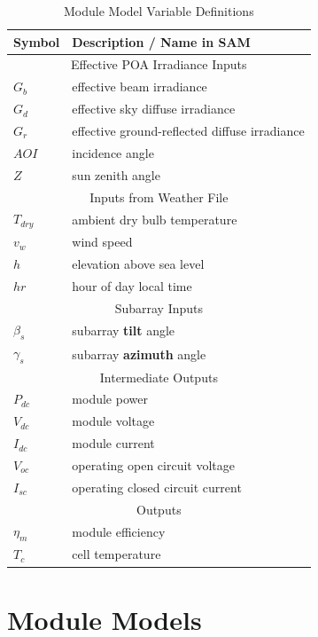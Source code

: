\documentclass[12pt,letterpaper]{article}
\newcommand\AOI{\ensuremath{\mathit{AOI}}}
\begin{document}
\begin{table}
\begin{center}
\caption{Module Model Variable Definitions}
\begin{tabular}{ll}
\midrule
Symbol & Description / \textbf{Name in SAM}\\
\midrule
\multicolumn{2}{c}{Effective POA Irradiance Inputs}\\
$G_b$ & effective beam irradiance \\
$G_d$ & effective sky diffuse irradiance \\
$G_r$ & effective ground-reflected diffuse irradiance  \\
$\AOI$ & incidence angle \\
$Z$ & sun zenith angle \\
\midrule
\multicolumn{2}{c}{Inputs from Weather File}\\
$T_{dry}$ & ambient dry bulb temperature  \\
$v_w$ & wind speed \\
$h$ & elevation above sea level \\
$\mathit{hr}$ & hour of day local time \\
\midrule
\multicolumn{2}{c}{Subarray Inputs}\\
$\beta_s$ & subarray \textbf{tilt} angle \\
$\gamma_s$ & subarray \textbf{azimuth} angle \\
\midrule
\multicolumn{2}{c}{Intermediate Outputs}\\
$P_{dc}$ & module power \\
$V_{dc}$ & module voltage \\
$I_{dc}$ & module current  \\
$V_{oc}$ & operating open circuit voltage  \\
$I_{sc}$ & operating closed circuit current \\
\midrule
\multicolumn{2}{c}{Outputs}\\
$\eta_m$ & module efficiency \\
$T_c$ & cell temperature \\
\midrule
\end{tabular}
\label{tab-modulevars}
\end{center}
\end{table}

\section{Module Models}\label{sec-moduleoptions}
\end{document}
